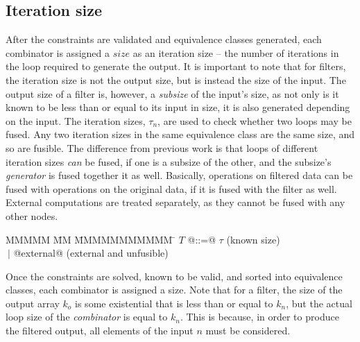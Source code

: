 \subsection{Iteration size}
After the constraints are validated and equivalence classes generated, each combinator is assigned a $size$ as an iteration size -- the number of iterations in the loop required to generate the output.
It is important to note that for filters, the iteration size is not the output size, but is instead the size of the input.
The output size of a filter is, however, a \emph{subsize} of the input's size, as not only is it known to be less than or equal to its input in size, it is also generated depending on the input.
The iteration sizes, $\tau_n$, are used to check whether two loops may be fused.
Any two iteration sizes in the same equivalence class are the same size, and so are fusible.
The difference from previous work is that loops of different iteration sizes \emph{can} be fused, if one is a subsize of the other, and the subsize's \emph{generator} is fused together it as well.
Basically, operations on filtered data can be fused with operations on the original data, if it is fused with the filter as well.
External computations are treated separately, as they cannot be fused with any other nodes.

\begin{tabbing}
MMMMM       \= MM \= MMMMMMMMMMM \= \kill
$T$          \> @::=@ \> $\tau$                                  \> (known size) \\
             \> $~|$  \> @external@                              \> (external and unfusible) \\
\end{tabbing}

Once the constraints are solved, known to be valid, and sorted into equivalence classes, each combinator is assigned a size.
Note that for a filter, the size of the output array $k_o$ is some existential that is less than or equal to $k_n$, but the actual loop size of the \emph{combinator} is equal to $k_n$.
This is because, in order to produce the filtered output, all elements of the input $n$ must be considered.


